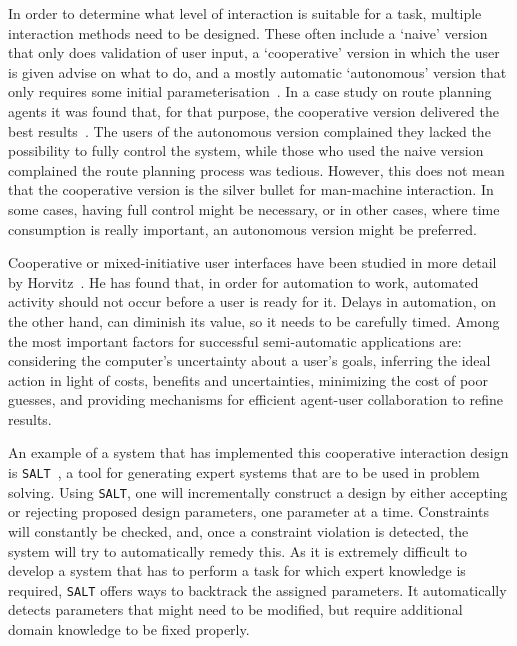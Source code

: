 In order to determine what level of interaction is suitable for a task, multiple interaction methods need to be designed. These often include a `naive' version that only does validation of user input, a `cooperative' version in which the user is given advise on what to do, and a mostly automatic `autonomous' version that only requires some initial parameterisation~\cite{payne2000varying,horvitz1999principles}. In a case study on route planning agents it was found that, for that purpose, the cooperative version delivered the best results~\cite{payne2000varying}. The users of the autonomous version complained they lacked the possibility to fully control the system, while those who used the naive version complained the route planning process was tedious. However, this does not mean that the cooperative version is the silver bullet for man-machine interaction. In some cases, having full control might be necessary, or in other cases, where time consumption is really important, an autonomous version might be preferred.

Cooperative or mixed-initiative user interfaces have been studied in more detail by Horvitz~\cite{horvitz1999principles}. He has found that, in order for automation to work, automated activity should not occur before a user is ready for it. Delays in automation, on the other hand, can diminish its value, so it needs to be carefully timed. Among the most important factors for successful semi-automatic applications are: considering the computer's uncertainty about a user's goals, inferring the ideal action in light of costs, benefits and uncertainties, minimizing the cost of poor guesses, and providing mechanisms for efficient agent-user collaboration to refine results.

An example of a system that has implemented this cooperative interaction design is \verb|SALT|~\cite{marcus1987taking}, a tool for generating expert systems that are to be used in problem solving. Using \verb|SALT|, one will incrementally construct a design by either accepting or rejecting proposed design parameters, one parameter at a time. Constraints will constantly be checked, and, once a constraint violation is detected, the system will try to automatically remedy this. As it is extremely difficult to develop a system that has to perform a task for which expert knowledge is required, \verb|SALT| offers ways to backtrack the assigned parameters. It automatically detects parameters that might need to be modified, but require additional domain knowledge to be fixed properly.

